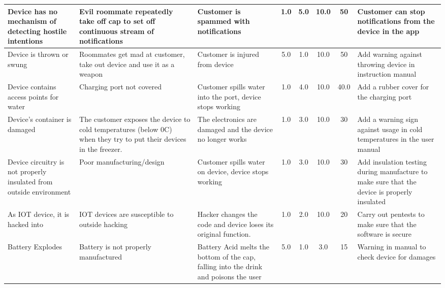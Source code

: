 \documentclass[12pt]{article}
\begin{document}
\begin{tabularx}{\textwidth}{ | X | X | X | >{\small}c | >{\small}c | >{\small}c | >{\small}c | X | }
			Device has no mechanism of detecting hostile intentions & Evil roommate repeatedly take off cap to set off continuous stream of notifications & Customer is spammed with notifications & 1.0 & 5.0 & 10.0 & 50 & Customer can stop notifications from the device in the app
			 \\ \hline
			Device is thrown or swung  & Roommates get mad at customer, take out device and use it as a weapon & Customer is injured from device
			& 5.0 & 1.0 & 10.0 & 50 & Add warning against throwing device in instruction manual  \\ \hline
			Device contains access points for water & Charging port not covered
			& Customer spills water into the port, device stops working & 1.0 & 4.0 & 10.0 & 40.0 & Add a rubber cover for the charging port   \\ \hline
			Device's container is damaged & The customer exposes the device to cold temperatures (below 0C) when they try to put their devices in the freezer. & The electronics are damaged and the device no longer works
			& 1.0 & 3.0 & 10.0 & 30 & Add a warning sign against usage in cold temperatures in the user manual
			 \\ \hline
			Device circuitry is not properly insulated from outside environment & Poor manufacturing/design  & Customer spills water on device, device stops working & 1.0 & 3.0 & 10.0 & 30 & Add insulation testing during manufacture to make sure that the device is properly insulated  \\ \hline
			As IOT device, it is hacked into & IOT devices are susceptible to outside hacking & Hacker changes the code and device loses its original function. & 1.0 & 2.0 & 10.0 & 20 & Carry out pentests to make sure that the software is secure  \\ \hline
			Battery Explodes & Battery is not properly manufactured & Battery Acid melts the bottom of the cap, falling into the drink and poisons the user
			& 5.0 & 1.0 & 3.0 & 15 & Warning in manual to check device for damages \\ \hline
		\end{tabularx}
		
\end{document}
